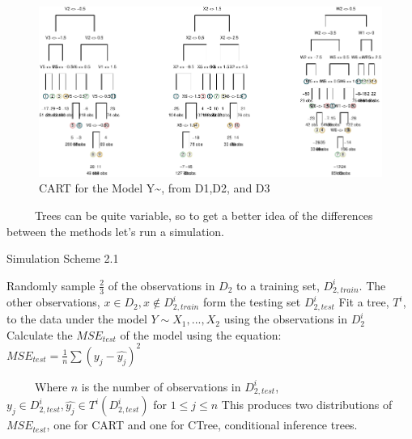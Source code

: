 \documentclass[12pt,twoside]{reedthesis}
\begin{document}
  \begin{figure}[htbp]
  \centering
  \includegraphics{Thesis_files/figure-latex/carts-1.pdf}
  \caption{\label{fig:carts}CART for the Model Y\textasciitilde{}, from D1,D2,
  and D3}
  \end{figure}
  
  ~~~~~Trees can be quite variable, so to get a better idea of the
  differences between the methods let's run a simulation.
  
  \begin{algorithm}
  \caption{Simulation Scheme 2.1}
  \label{sim2.1}
  \begin{algorithmic}[1]
  \State Randomly sample $\frac 2 3$  of the observations in  $D_2$  to a training set,  $D_{2, train}^i$. The other observations,  $x \in D_2, x \notin D_{2, train}^i$ form the testing set $D_{2, test}^i$
  \State Fit a tree, $T^i$, to the data under the model $Y \sim X_1,...,X_2$ using the observations in      $D_{2}^i$
  \State Calculate the $MSE_{test}$ of the model using the equation:
      $MSE_{test} = \frac 1 n \sum (y_j - \hat{y_j})^2$
  \EndFor
  \end{algorithmic}
  \end{algorithm}
  
  ~~~~~Where \(n\) is the number of observations in \(D_{2, test}^i\),
  \(y_j \in D_{2, test}^i, \hat{y_j} \in T^i(D_{2, test}^i)\) for
  \(1 \leq j \leq n\) This produces two distributions of \(MSE_{test}\),
  one for CART and one for CTree, conditional inference trees.
  
\end{document}
